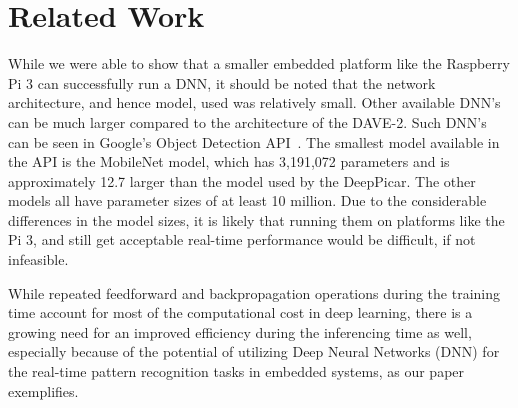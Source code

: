 \section{Related Work}
  
While we were able to show that a smaller embedded platform like the 
Raspberry Pi 3 can successfully run a DNN, it should be noted that the
network architecture, and hence model, used was relatively small. Other 
available DNN's can be much larger compared to the architecture of the
DAVE-2. Such DNN's can be seen in Google's Object Detection API~\cite{huang2017speed}.
The smallest model available in the API is the MobileNet model, which
has 3,191,072 parameters and is approximately 12.7 larger than the
model used by the DeepPicar. The other models all have parameter sizes 
of at least 10 million. Due to the considerable differences in the 
model sizes, it is likely that running them on platforms like the Pi 3,
and still get acceptable real-time performance would be difficult, 
if not infeasible. 

While repeated feedforward and backpropagation operations during
the training time account for most of the computational cost in
deep learning, there is a growing need for an improved efficiency
during the inferencing time as well, especially because of the
potential of utilizing Deep Neural Networks (DNN) for the real-time
pattern recognition tasks in embedded systems, as our paper
exemplifies.

